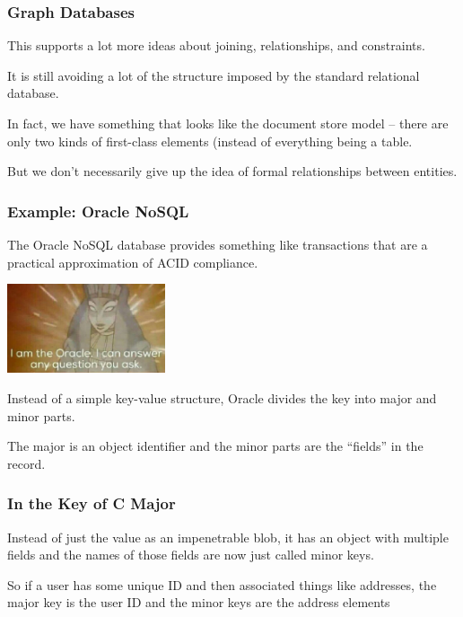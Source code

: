 \begin{frame}
\frametitle{Graph Databases}

This supports a lot more ideas about joining, relationships, and constraints. 

It is still avoiding a lot of the structure imposed by the standard relational database.

In fact, we have something that looks like the document store model -- there are only two kinds of first-class elements (instead of everything being a table.  

But we don't necessarily give up the idea of formal relationships between entities.


\end{frame}



\begin{frame}
\frametitle{Example: Oracle NoSQL}

The Oracle NoSQL database provides something like transactions that are a practical approximation of ACID compliance. 

\begin{center}
	\includegraphics[width=0.35\textwidth]{images/oracle.jpg}
\end{center}

Instead of a simple key-value structure, Oracle divides the key into major and minor parts. 

The major is an object identifier and the minor parts are the ``fields'' in the record. 

\end{frame}


\begin{frame}
\frametitle{In the Key of C Major}

Instead of just the value as an impenetrable blob, it has an object with multiple fields and the names of those fields are now just called minor keys. 

So if a user has some unique ID and then associated things like addresses, the major key is the user ID and the minor keys are the address elements


\end{frame}




